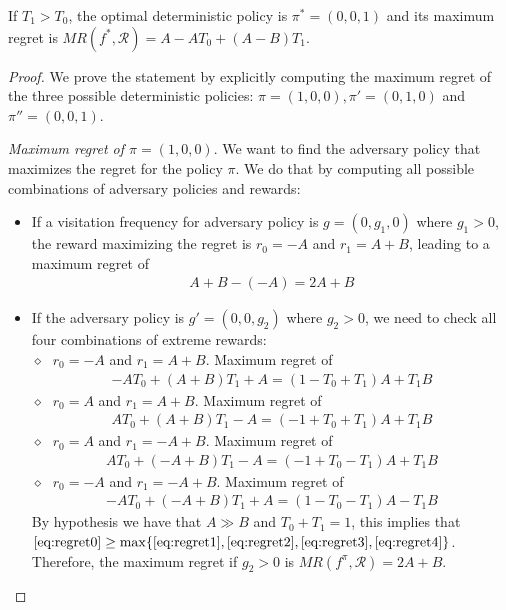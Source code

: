 \begin{proposition}\label{theorem:opt_det}
If $T_1 > T_0$, the optimal deterministic policy is $\pi^* = (0, 0, 1)$ and its maximum regret is $MR(f^*, \mathcal{R}) = A- A T_0 +(A-B) T_1$. 
\end{proposition}
\begin{proof}
We prove the statement by explicitly computing the maximum regret of the three possible deterministic policies: $\pi = (1, 0, 0), \pi' =(0, 1, 0)$ and $ \pi''= (0, 0, 1)$. 

\textit{Maximum regret of $\pi = (1, 0, 0)$}. We want to find the adversary policy that maximizes the regret for the policy $\pi$. We do that by computing all possible combinations of adversary policies and rewards:

\begin{itemize}
\item If a visitation frequency for adversary policy is $g = (0, g_1, 0)$ where $g_1> 0$, the reward maximizing the regret is $r_0 = -A$ and $r_1 = A+B$, leading to a maximum regret of 
\begin{align}
A+B-(-A)=2A+B \label{eq:regret0}
\end{align}

\item If the adversary policy is $g' = (0, 0, g_2)$ where $g_2>0$, we need to check all four combinations of extreme rewards: \\
{\footnotesize 
$\diamond~~~ r_0 = -A$ and $r_1= A+B$. Maximum regret of
\begin{align} 
-A T_0 + (A+B)T_1 + A = (1-T_0 + T_1)A + T_1 B \label{eq:regret1}
\end{align}
$\diamond~~~ r_0 = A$ and $r_1= A+B$. Maximum regret of
\begin{align}
A T_0 + (A+B)T_1 - A = (-1+T_0 + T_1)A + T_1 B  \label{eq:regret2}
\end{align}
$\diamond~~~ r_0 = A$ and $r_1= -A+B$. Maximum regret of
\begin{align} 
A T_0 + (-A+B)T_1 - A =  (-1+T_0 - T_1)A + T_1 B \label{eq:regret3}
\end{align}
$\diamond~~~ r_0 = -A$ and $r_1= -A+B$. Maximum regret of
\begin{align}
-A T_0 + (-A+B)T_1 + A =  (1 - T_0 - T_1)A - T_1 B \label{eq:regret4}
\end{align}
}
By hypothesis we have that $A\gg B$ and $T_0+T_1= 1$, this implies that $\eqref{eq:regret0} \geq \max\{\eqref{eq:regret1}, \eqref{eq:regret2}, \eqref{eq:regret3}, \eqref{eq:regret4} \}$. Therefore, the maximum regret if $g_2>0$ is $MR(f^{\pi}, \mathcal{R}) = 2A+B$.
\end{itemize} 


\end{proof}
